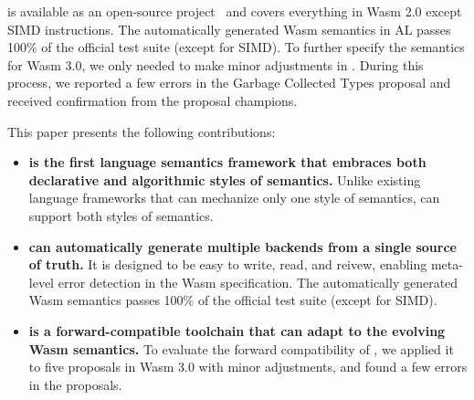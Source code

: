 \spectec is available as an open-source project~\cite{spectec}
and covers everything in Wasm 2.0 except SIMD instructions.
The automatically generated Wasm semantics in AL passes
100\% of the official test suite (except for SIMD).
To further specify the semantics for Wasm 3.0, we only needed
to make minor adjustments in \spectec. During this process, we
reported a few errors in the Garbage Collected Types proposal and
received confirmation from the proposal champions.

This paper presents the following contributions:
\begin{itemize}
\item \textbf{\spectec is the first language semantics framework that
embraces both declarative and algorithmic styles of semantics.}
Unlike existing language frameworks that can mechanize only one style of semantics,
\spectec can support both styles of semantics.

\item \textbf{\spectec can automatically generate multiple backends from 
a single source of truth.}
It is designed to be easy to write, read, and reivew, enabling
meta-level error detection in the Wasm specification.
The automatically generated Wasm semantics passes
100\% of the official test suite (except for SIMD).


\item \textbf{\spectec is a forward-compatible toolchain that can
adapt to the evolving Wasm semantics.}
To evaluate the forward compatibility of \spectec, we applied it to five proposals
in Wasm 3.0 with minor adjustments, and found a few errors in the proposals.
\end{itemize}
